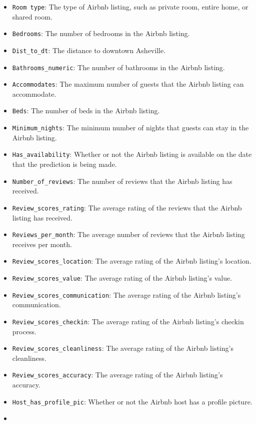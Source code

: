 \documentclass[
  letterpaper,
  DIV=11,
  numbers=noendperiod]{scrartcl}
\providecommand{\tightlist}{%
  \setlength{\itemsep}{0pt}\setlength{\parskip}{0pt}}\usepackage{longtable,booktabs,array}
\begin{document}
\begin{itemize}
\tightlist
\item
  \texttt{Room\ type}: The type of Airbnb listing, such as private room,
  entire home, or shared room.
\item
  \texttt{Bedrooms}: The number of bedrooms in the Airbnb listing.
\item
  \texttt{Dist\_to\_dt}: The distance to downtown Asheville.
\item
  \texttt{Bathrooms\_numeric}: The number of bathrooms in the Airbnb
  listing.
\item
  \texttt{Accommodates}: The maximum number of guests that the Airbnb
  listing can accommodate.
\item
  \texttt{Beds}: The number of beds in the Airbnb listing.
\item
  \texttt{Minimum\_nights}: The minimum number of nights that guests can
  stay in the Airbnb listing.
\item
  \texttt{Has\_availability}: Whether or not the Airbnb listing is
  available on the date that the prediction is being made.
\item
  \texttt{Number\_of\_reviews}: The number of reviews that the Airbnb
  listing has received.
\item
  \texttt{Review\_scores\_rating}: The average rating of the reviews
  that the Airbnb listing has received.
\item
  \texttt{Reviews\_per\_month}: The average number of reviews that the
  Airbnb listing receives per month.
\item
  \texttt{Review\_scores\_location}: The average rating of the Airbnb
  listing's location.
\item
  \texttt{Review\_scores\_value}: The average rating of the Airbnb
  listing's value.
\item
  \texttt{Review\_scores\_communication}: The average rating of the
  Airbnb listing's communication.
\item
  \texttt{Review\_scores\_checkin}: The average rating of the Airbnb
  listing's checkin process.
\item
  \texttt{Review\_scores\_cleanliness}: The average rating of the Airbnb
  listing's cleanliness.
\item
  \texttt{Review\_scores\_accuracy}: The average rating of the Airbnb
  listing's accuracy.
\item
  \texttt{Host\_has\_profile\_pic}: Whether or not the Airbnb host has a
  profile picture.
\item

\end{itemize}
\end{document}
